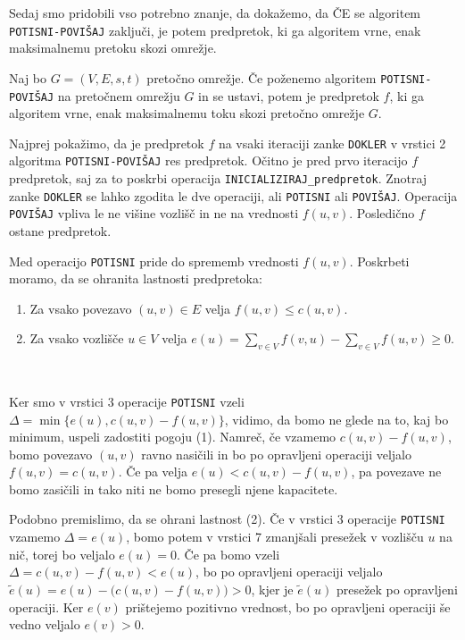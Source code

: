 \documentclass[mat1]{fmfdelo}
\begin{document}
Sedaj smo pridobili vso potrebno znanje, da dokažemo, da ČE se algoritem \texttt{POTISNI-POVIŠAJ} zaključi, je potem predpretok, ki ga algoritem vrne, enak maksimalnemu pretoku skozi omrežje.

\begin{izrek}
Naj bo $G=(V,E,s,t)$ pretočno omrežje. Če poženemo algoritem \texttt{POTISNI-POVIŠAJ} na pretočnem omrežju $G$ in se ustavi, potem je predpretok $f$, ki ga algoritem vrne, enak maksimalnemu toku skozi pretočno omrežje $G$.
\end{izrek}

\begin{dokaz}
Najprej pokažimo, da je predpretok $f$ na vsaki iteraciji zanke \texttt{DOKLER} v vrstici 2 algoritma \texttt{POTISNI-POVIŠAJ} res predpretok. Očitno je pred prvo iteracijo $f$ predpretok, saj za to poskrbi operacija \texttt{INICIALIZIRAJ\_predpretok}. Znotraj zanke \texttt{DOKLER} se lahko zgodita le dve operaciji, ali \texttt{POTISNI} ali \texttt{POVIŠAJ}. Operacija \texttt{POVIŠAJ} vpliva le ne višine vozlišč in ne na vrednosti $f(u,v)$. Posledično $f$ ostane predpretok.

Med operacijo \texttt{POTISNI} pride do sprememb vrednosti $f(u,v)$. Poskrbeti moramo, da se ohranita lastnosti predpretoka:\\

\begin{enumerate}
\item Za vsako povezavo $(u,v) \in E$ velja $f(u,v) \leq c(u,v)$.
\item Za vsako vozlišče $u \in V$ velja $e(u) = \sum_{v\in V} f(v,u) - \sum_{v\in V} f(u,v) \geq 0$.
\end{enumerate}~

Ker smo v vrstici 3 operacije \texttt{POTISNI} vzeli $\Delta = \min\{e(u), c(u,v) - f(u,v)\}$, vidimo, da bomo ne glede na to, kaj bo minimum, uspeli zadostiti pogoju (1). Namreč, če vzamemo $c(u,v) - f(u,v)$, bomo povezavo $(u,v)$ ravno nasičili in bo po opravljeni operaciji veljalo $f(u,v) = c(u,v)$. Če pa velja $e(u) < c(u,v) - f(u,v)$, pa povezave ne bomo zasičili in tako niti ne bomo presegli njene kapacitete.

Podobno premislimo, da se ohrani lastnost (2). Če v vrstici 3 operacije \texttt{POTISNI} vzamemo $\Delta = e(u)$, bomo potem v vrstici 7 zmanjšali presežek v vozlišču $u$ na nič, torej bo veljalo $e(u) = 0$. Če pa bomo vzeli $\Delta = c(u,v) - f(u,v) < e(u)$, bo po opravljeni operaciji veljalo $\tilde{e}(u) = e(u) - \big(c(u,v) - f(u,v)\big) > 0$, kjer je $\tilde{e}(u)$ presežek po opravljeni operaciji. Ker $e(v)$ prištejemo pozitivno vrednost, bo po opravljeni operaciji še vedno veljalo $e(v) > 0$.\\


\end{dokaz}
\end{document}
